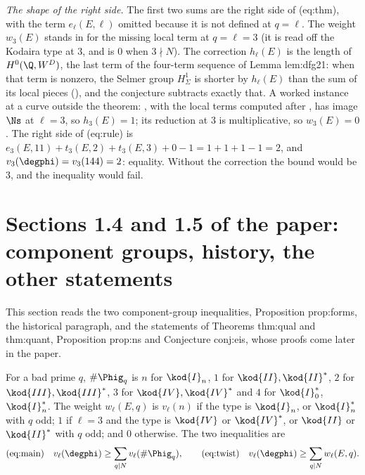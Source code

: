 \begin{sloppypar}
\emph{The shape of the right side.} The first two sums are the right side of (eq:thm), with the term $e_\ell(E,\ell)$ omitted because it is not defined at $q=\ell$. The weight
$w_3(E)$ stands in for the missing local term at $q=\ell=3$ (it is read off the Kodaira type at $3$, and is $0$ when $3\nmid N$). The correction $h_\ell(E)$ is the length of
$H^0(\Q,W^D)$, the last term of the four-term sequence of Lemma lem:dfg21: when that term is nonzero, the Selmer group $H^1_\Sigma$ is shorter by $h_\ell(E)$ than the sum of its
local pieces (), and the conjecture subtracts exactly that. A worked instance at a curve outside the theorem: , with the local
terms computed after , has image $\Ns$ at $\ell=3$, so $h_3(E)=1$; its reduction at $3$ is multiplicative, so $w_3(E)=0$. The right side of (eq:rule) is
$e_3(E,11)+t_3(E,2)+t_3(E,3)+0-1=1+1+1-1=2$, and $v_3(\degphi)=v_3(144)=2$: equality. Without the correction the bound would be $3$, and the inequality would fail.

\section[Paper 1.4, 1.5: the other statements]{Sections 1.4 and 1.5 of the paper: component groups, history, the other statements}\label{sec:paper:forms-history}

This section reads the two component-group inequalities, Proposition prop:forms, the historical paragraph, and the statements of Theorems thm:qual
and thm:quant, Proposition prop:ns and Conjecture conj:eis, whose proofs come later in the paper.

\begin{definition}\label{def:paper:weights}
For a bad prime $q$, $\#\Phig_q$ is $n$ for $\kod{I}_n$, $1$ for $\kod{II},\kod{II}^*$, $2$ for $\kod{III},\kod{III}^*$, $3$ for $\kod{IV},\kod{IV}^*$ and $4$ for $\kod{I}_0^*$, $\kod{I}_n^*$. The weight
$w_\ell(E,q)$ is $v_\ell(n)$ if the type is $\kod{I}_n$, or $\kod{I}_n^*$ with $q$ odd; $1$ if $\ell=3$ and the type is $\kod{IV}$ or $\kod{IV}^*$, or $\kod{II}$ or $\kod{II}^*$ with $q$ odd; and $0$
otherwise. The two inequalities are
\[
\text{(eq:main)}\quad v_\ell(\degphi)\ge\sum_{q\mid N}v_\ell(\#\Phig_q),\qquad\text{(eq:twist)}\quad v_\ell(\degphi)\ge\sum_{q\mid N}w_\ell(E,q).
\]
\end{definition}


\end{sloppypar}
